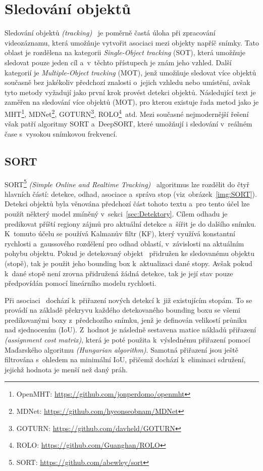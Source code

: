 \section{Sledování objektů}
Sledování objektů \emph{(tracking)}~\cite{article:Tracking} je poměrně častá úloha při zpracování videozáznamu, která umožňuje vytvořit asociaci mezi objekty napříč snímky. Tato oblast je rozdělena na kategorii \emph{Single-Object tracking} (SOT), která umožňuje sledovat pouze jeden cíl a~v~těchto přístupech je znám jeho vzhled. Další kategorií je \emph{Multiple-Object tracking} (MOT), jenž umožňuje sledovat více objektů současně bez jakékoliv předchozí znalosti o~jejich vzhledu nebo umístění, avšak tyto metody vyžadují jako první krok provést detekci objektů. Následující text je zaměřen na sledování více objektů (MOT), pro kterou existuje řada metod jako je MHT\footnote{OpenMHT: \url{https://github.com/jonperdomo/openmht}}, MDNet\footnote{MDNet: \url{https://github.com/hyeonseobnam/MDNet}}, GOTURN\footnote{GOTURN: \url{https://github.com/davheld/GOTURN}}, ROLO\footnote{ROLO: \url{https://github.com/Guanghan/ROLO}}~atd. Mezi současné nejmodernější řešení však patří algoritmy SORT a~DeepSORT, které umožňují i sledování v~reálném čase s~vysokou snímkovou frekvencí.

\subsection{SORT}
\label{sec:SORT}
SORT\footnote{SORT: \url{https://github.com/abewley/sort}} \emph{(Simple Online and Realtime Tracking)}~\cite{website:Tracking} algoritmus lze rozdělit do čtyř hlavních částí: detekce, odhad, asociace a~správa stop (viz~obrázek~\ref{img:SORT}). Detekci objektů byla věnována předchozí část tohoto textu a~pro tento účel lze použít některý model zmíněný v~sekci~\ref{sec:Detektory}. Cílem odhadu je predikovat příští regiony zájmů pro aktuální detekce a~šířit je do dalšího snímku. K~tomuto účelu se používá Kalmanův filtr (KF), který využívá konstantní rychlosti a~gaussového rozdělení pro odhad oblastí, v~závislosti na aktuálním pohybu objektu. Pokud je detekovaný objekt~\cite{article:Tracking} přidružen ke sledovanému objektu (stopě), tak je použit jeho bounding box k~aktualizaci dané stopy. Avšak pokud k~dané stopě není zrovna přidružená žádná detekce, tak je její stav pouze předpovídán pomocí lineárního modelu rychlosti.

Při asociaci~\cite{article:SORT, website:Tracking, article:Tracking} dochází k~přiřazení nových detekcí k~již existujícím stopám. To se provádí na základě překryvu každého detekovaného bounding boxu se všemi predikovanými boxy z~předchozího snímku, jenž je definován velikostí průniku nad sjednocením (IoU). Z~hodnot je následně sestavena matice nákladů přiřazení \emph{(assignment cost matrix)}, která je poté použita k~výslednému přiřazení pomocí Maďarského algoritmu \emph{(Hungarian algorithm)}. Samotná přiřazení jsou ještě filtrována s~ohledem na minimální IoU, přičemž dochází k~eliminaci sdružení, jejichž hodnota je menší než daný práh. 

